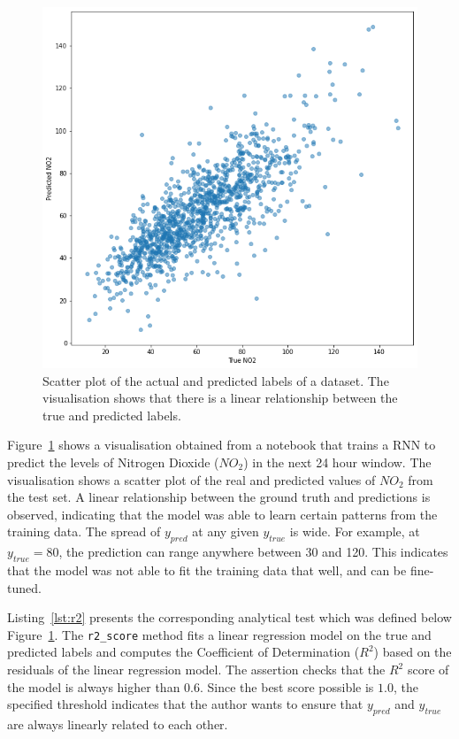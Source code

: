\documentclass[conference]{IEEEtran}
\begin{document}
\begin{figure}
  \includegraphics[width=\linewidth]{../catalogue/select-332a.png}
  \caption{Scatter plot of the actual and predicted labels of a dataset. The visualisation shows that there is a linear relationship between the true and predicted labels.}\label{fig:r2}
\end{figure}

Figure~\ref{fig:r2} shows a visualisation obtained from a notebook that trains a RNN to predict the levels of Nitrogen Dioxide ($NO_2$) in the next 24 hour window. The visualisation shows a scatter plot of the real and predicted values of $NO_2$ from the test set. A linear relationship between the ground truth and predictions is observed, indicating that the model was able to learn certain patterns from the training data. The spread of $y_{pred}$ at any given $y_{true}$ is wide. For example, at $y_{true} = 80$, the prediction can range anywhere between 30 and 120. This indicates that the model was not able to fit the training data that well, and can be fine-tuned.

Listing~\ref{lst:r2} presents the corresponding analytical test which was defined below Figure~\ref{fig:r2}. The \texttt{r2\_score} method fits a linear regression model on the true and predicted labels and computes the Coefficient of Determination ($R^2$) based on the residuals of the linear regression model. The assertion checks that the $R^2$ score of the model is always higher than $0.6$. Since the best score possible is $1.0$, the specified threshold indicates that the author wants to ensure that $y_{pred}$ and $y_{true}$ are always linearly related to each other.
\end{document}
